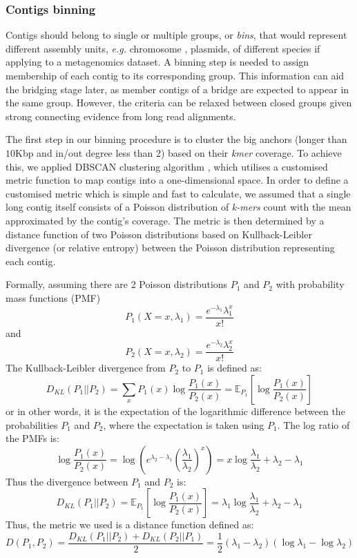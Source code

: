 \documentclass[10pt,letterpaper]{article}
\newcommand{\EG}{\emph{e.g.}}
\begin{document}
\subsubsection*{Contigs binning}
Contigs should belong to single or multiple groups, or \emph{bins}, that would represent different assembly units, \EG{} chromosome , plasmids, of different species if applying to a metagenomics dataset. 
A binning step is needed to assign membership of each contig to its corresponding group. 
This information can aid the bridging stage later, as member contigs of a bridge are expected to appear in the same group. However, the criteria can be relaxed between closed groups given strong connecting evidence from long read alignments.

The first step in our binning procedure is to cluster the big anchors (longer than $10$Kbp and in/out degree less than 2) based on their \emph{kmer} coverage.
To achieve this, we applied DBSCAN clustering algorithm \cite{Ester96adensity-based}, which utilises a customised metric function to map contigs into a one-dimensional space.  In order to 
 define a customised metric which is simple and fast to calculate, we assumed that a single long contig itself consists of a Poisson distribution of \emph{k-mers} count with the mean approximated by the contig's coverage. 
The metric is then determined by a distance function of two Poisson distributions based on Kullback-Leibler divergence (or relative entropy) between the Poisson distribution representing each contig\cite{Kullback1951information}.

Formally, assuming there are 2 Poisson distributions $P_1$ and $P_2$ with probability mass functions (PMF) $$P_1(X=x,\lambda_1)=\frac{e^{-\lambda_1}\lambda_1^x}{x!}$$ and $$P_2(X=x,\lambda_2)=\frac{e^{-\lambda_2}\lambda_2^x}{x!}$$ 
The Kullback-Leibler divergence from $P_2$ to $P_1$ is defined as:
$$D_{KL}(P_1||P_2)=\sum_{x}{P_1(x)\log{\frac{P_1(x)}{P_2(x)}}}=\mathbb{E}_{P_1}[\log{\frac{P_1(x)}{P_2(x)}}]$$
or in other words,  it is the expectation of the logarithmic difference between the probabilities $P_1$ and $P_2$, where the expectation is taken using $P_1$.
The log ratio of the PMFs is:
$$\log{\frac{P_1(x)}{P_2(x)}}=\log{(e^{\lambda_2-\lambda_1}{(\frac{\lambda_1}{\lambda_2})}^x)}=x\log{\frac{\lambda_1}{\lambda_2}}+\lambda_2-\lambda_1$$
Thus the divergence between $P_1$ and $P_2$ is:
$$D_{KL}(P_1||P_2)=\mathbb{E}_{P_1}[\log{\frac{P_1(x)}{P_2(x)}}]=\lambda_1\log{\frac{\lambda_1}{\lambda_2}}+\lambda_2-\lambda_1$$
Thus, the metric we used is a distance function defined as:
$$D(P_1,P_2)=\frac{D_{KL}(P_1||P_2)+D_{KL}(P_2||P_1)}{2}=\frac{1}{2}(\lambda_1-\lambda_2)(\log{\lambda_1}-\log{\lambda_2})$$
\end{document}
